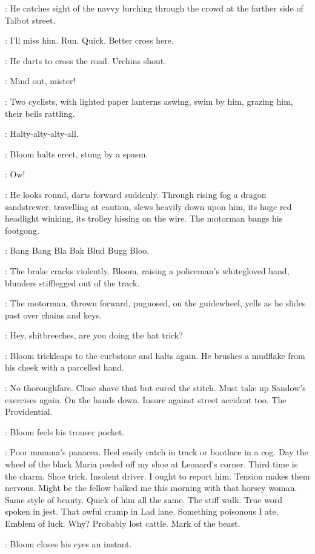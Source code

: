 :
He catches sight of the navvy lurching through the crowd
at the farther side of Talbot street.

\Bloom:
I'll miss him.
Run.
Quick.
Better cross here.

:
He darts to cross the road.
Urchins shout.

\Urchins:
Mind out,
mister!

:
Two cyclists,
with lighted paper lanterns aswing,
swim by him,
grazing him,
their bells rattling.

\Bells:
Halty-alty-alty-all.

:
Bloom halts erect,
stung by a spasm.

\Bloom:
Ow!

:
He looks round,
darts forward suddenly.
Through rising fog a dragon sandstrewer,
travelling at caution,
slews heavily down upon him,
its huge red headlight winking,
its trolley hissing on the wire.
The motorman bangs his footgong.

\Gong:
Bang Bang Bla Bak Blud Bugg Bloo.

:
The brake cracks violently.
Bloom,
raising a policeman's whitegloved hand,
blunders stifflegged out of the track.

:
The motorman,
thrown forward,
pugnosed,
on the guidewheel,
yells as he slides past over chains and keys.

\Motorman:
Hey,
shitbreeches,
are you doing the hat trick?

:
Bloom trickleaps to the curbstone and halts again.
He brushes a mudflake from his cheek with a parcelled hand.

\Bloom:
No thoroughfare.
Close shave that but cured the stitch.
Must take up Sandow's exercises again.
On the hands down.
Insure against street accident too.
The Providential.

:
Bloom feels his trouser pocket.

\Bloom:
Poor mamma's panacea.
Heel easily catch in track or bootlace in a cog.
Day the wheel of the black Maria peeled off my shoe at Leonard's corner.
Third time is the charm.
Shoe trick.
Insolent driver.
I ought to report him.
Tension makes them nervous.
Might be the fellow balked me this morning with that horsey woman.
Same style of beauty.
Quick of him all the same.
The stiff walk.
True word spoken in jest.
That awful cramp in Lad lane.
Something poisonous I ate.
Emblem of luck.
Why?
Probably lost cattle.
Mark of the beast.

:
Bloom closes his eyes an instant.

